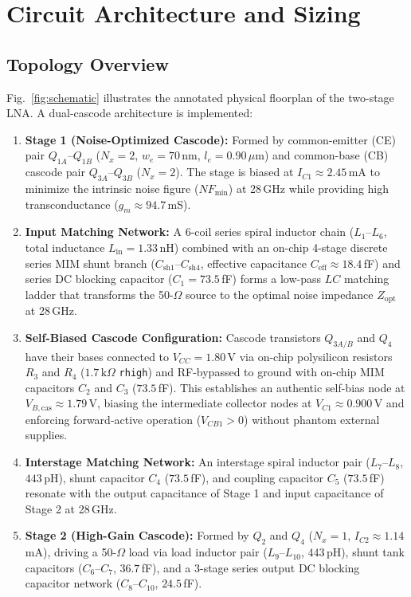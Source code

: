 \documentclass[conference]{IEEEtran}
\begin{document}
\section{Circuit Architecture and Sizing}

\subsection{Topology Overview}
Fig.~\ref{fig:schematic} illustrates the annotated physical floorplan of the two-stage LNA. A dual-cascode architecture is implemented:
\begin{enumerate}
    \item \textbf{Stage 1 (Noise-Optimized Cascode):} Formed by common-emitter (CE) pair $Q_{1A}$--$Q_{1B}$ ($N_x = 2$, $w_e = 70\,\text{nm}$, $l_e = 0.90\,\mu\text{m}$) and common-base (CB) cascode pair $Q_{3A}$--$Q_{3B}$ ($N_x = 2$). The stage is biased at $I_{C1} \approx 2.45$\,mA to minimize the intrinsic noise figure ($NF_{\min}$) at 28\,GHz while providing high transconductance ($g_m \approx 94.7$\,mS).
    \item \textbf{Input Matching Network:} A 6-coil series spiral inductor chain ($L_1$--$L_6$, total inductance $L_{\text{in}} = 1.33$\,nH) combined with an on-chip 4-stage discrete series MIM shunt branch ($C_{\text{sh1}}$--$C_{\text{sh4}}$, effective capacitance $C_{\text{eff}} \approx 18.4$\,fF) and series DC blocking capacitor ($C_1 = 73.5$\,fF) forms a low-pass $LC$ matching ladder that transforms the 50-$\Omega$ source to the optimal noise impedance $Z_{\text{opt}}$ at 28\,GHz.
    \item \textbf{Self-Biased Cascode Configuration:} Cascode transistors $Q_{3A/B}$ and $Q_4$ have their bases connected to $V_{CC} = 1.80$\,V via on-chip polysilicon resistors $R_3$ and $R_4$ ($1.7\,\text{k}\Omega$ \texttt{rhigh}) and RF-bypassed to ground with on-chip MIM capacitors $C_2$ and $C_3$ ($73.5$\,fF). This establishes an authentic self-bias node at $V_{B,\text{cas}} \approx 1.79$\,V, biasing the intermediate collector nodes at $V_{C1} \approx 0.900$\,V and enforcing forward-active operation ($V_{CB1} > 0$) without phantom external supplies.
    \item \textbf{Interstage Matching Network:} An interstage spiral inductor pair ($L_7$--$L_8$, $443$\,pH), shunt capacitor $C_4$ ($73.5$\,fF), and coupling capacitor $C_5$ ($73.5$\,fF) resonate with the output capacitance of Stage 1 and input capacitance of Stage 2 at 28\,GHz.
    \item \textbf{Stage 2 (High-Gain Cascode):} Formed by $Q_2$ and $Q_4$ ($N_x = 1$, $I_{C2} \approx 1.14$\,mA), driving a 50-$\Omega$ load via load inductor pair ($L_9$--$L_{10}$, $443$\,pH), shunt tank capacitors ($C_6$--$C_7$, $36.7$\,fF), and a 3-stage series output DC blocking capacitor network ($C_8$--$C_{10}$, $24.5$\,fF).
\end{enumerate}
\end{document}

